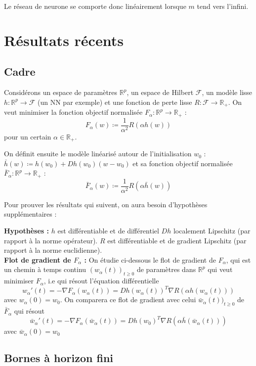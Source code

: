 \documentclass[a4paper, 11pt, french]{article}
\theoremstyle{definition}
\begin{document}
	Le réseau de neurone se comporte donc linéairement lorsque $m$ tend vers l'infini.
	
	\newpage
	
	\section{Résultats récents}
	
	\subsection{Cadre}
	
	Considérons un espace de paramètres $\mathbb{R}^p$, un espace de Hilbert $\mathcal{F}$, un modèle lisse $h : \mathbb{R}^p \to \mathcal{F}$ (un NN par exemple) et une fonction de perte lisse $R : \mathcal{F} \to \mathbb{R}_+$. On veut minimiser la fonction objectif normalisée $F_{\alpha} : \mathbb{R}^p \to \mathbb{R}_+$ : \[F_{\alpha} (w) \coloneqq \frac{1}{\alpha^2} R(\alpha h(w))\] pour un certain $\alpha \in \mathbb{R}_+$.
	
	On définit ensuite le modèle linéarisé autour de l'initialisation $w_0$ : $\bar{h} (w) \coloneqq h(w_0) + Dh(w_0)(w - w_0)$ et sa fonction objectif normalisée $\bar{F}_{\alpha} : \mathbb{R}^p \to \mathbb{R}_+$ : \[\bar{F}_{\alpha} (w) \coloneqq \frac{1}{\alpha^2} R(\alpha \bar{h}(w))\]
	
	Pour prouver les résultats qui suivent, on aura besoin d'hypothèses supplémentaires :
		
	{\bf Hypothèses : } $h$ est différentiable et de différentiel $Dh$ localement Lipschitz (par rapport à la norme opérateur). $R$ est différentiable et de gradient Lipschitz (par rapport à la norme euclidienne). \\
	
	{\bf Flot de gradient de $F_{\alpha}$ : } On étudie ci-dessous le flot de gradient de $F_{\alpha}$, qui est un chemin à temps continu $(w_{\alpha}(t))_{t\geq 0}$ de paramètres dans $\mathbb{R}^p$ qui veut minimiser $F_{\alpha}$, i.e qui résout l'équation différentielle 
	\[w_{\alpha}'(t) = - \nabla F_{\alpha}(w_{\alpha}(t)) = Dh (w_{\alpha}(t))^T \nabla R (\alpha h(w_{\alpha}(t)))\] avec $w_{\alpha}(0) = w_0$. On comparera ce flot de gradient avec celui $\bar{w}_{\alpha}(t))_{t\geq 0}$ de $\bar{F}_{\alpha}$ qui résout
	\[\bar{w}_{\alpha}'(t) = - \nabla F_{\alpha}(\bar{w}_{\alpha}(t)) = Dh (w_0)^T \nabla R (\alpha \bar{h}(\bar{w}_{\alpha}(t)))\] avec $\bar{w}_{\alpha}(0) = w_0$
	
	\subsection{Bornes à horizon fini}
	
\end{document}
